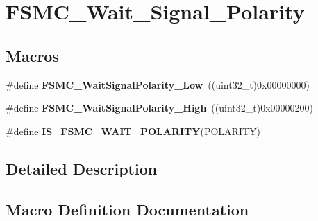 \hypertarget{group___f_s_m_c___wait___signal___polarity}{}\section{F\+S\+M\+C\+\_\+\+Wait\+\_\+\+Signal\+\_\+\+Polarity}
\label{group___f_s_m_c___wait___signal___polarity}
\subsection*{Macros}
\begin{DoxyCompactItemize}
\item 
\hypertarget{group___f_s_m_c___wait___signal___polarity_ga7dc72fdfc6225e5daa9b8efee8dff49f}{}\#define {\bfseries F\+S\+M\+C\+\_\+\+Wait\+Signal\+Polarity\+\_\+\+Low}~((uint32\+\_\+t)0x00000000)\label{group___f_s_m_c___wait___signal___polarity_ga7dc72fdfc6225e5daa9b8efee8dff49f}

\item 
\hypertarget{group___f_s_m_c___wait___signal___polarity_ga3418f29249a261edb1359d1bcdc43661}{}\#define {\bfseries F\+S\+M\+C\+\_\+\+Wait\+Signal\+Polarity\+\_\+\+High}~((uint32\+\_\+t)0x00000200)\label{group___f_s_m_c___wait___signal___polarity_ga3418f29249a261edb1359d1bcdc43661}

\item 
\#define {\bfseries I\+S\+\_\+\+F\+S\+M\+C\+\_\+\+W\+A\+I\+T\+\_\+\+P\+O\+L\+A\+R\+I\+T\+Y}(P\+O\+L\+A\+R\+I\+T\+Y)
\end{DoxyCompactItemize}


\subsection{Detailed Description}


\subsection{Macro Definition Documentation}
\hypertarget{group___f_s_m_c___wait___signal___polarity_gabc5321807d5184fe5cdb7848e1be7bc6}{}
